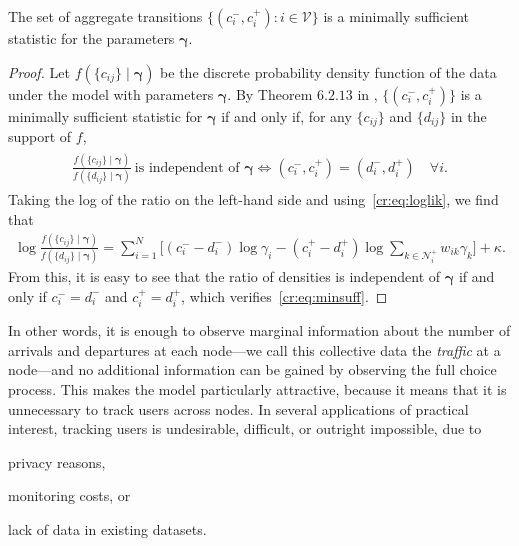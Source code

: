 \begin{theorem}
The set of aggregate transitions  $\{ (c^-_i, c^+_i) : i \in \mathcal{V} \}$ is a minimally sufficient statistic for the parameters $\bm{\gamma}$.
\end{theorem}

\begin{proof}
Let $f(\{ c_{ij} \} \mid \bm{\gamma})$ be the discrete probability density function of the data under the model with parameters $\bm{\gamma}$.
By Theorem $6.2.13$ in \citet{casella2002statistical}, $\{ (c^-_i, c^+_i) \}$ is a minimally sufficient statistic for $\bm{\gamma}$ if and only if, for any $\{ c_{ij} \}$ and $\{ d_{ij} \}$ in the support of $f$,
\begin{align}
\label{cr:eq:minsuff}
\begin{aligned}
\frac{ f(\{ c_{ij} \} \mid \bm{\gamma}) }{ f(\{ d_{ij} \} \mid \bm{\gamma}) }\ \text{is independent of $\bm{\gamma}$}
\iff (c^-_i, c^+_i) = (d^-_i, d^+_i) \quad \forall i.
\end{aligned}
\end{align}
Taking the log of the ratio on the left-hand side and using~\eqref{cr:eq:loglik}, we find that
\begin{align*}
\log \frac{ f(\{ c_{ij} \} \mid \bm{\gamma}) }{ f(\{ d_{ij} \} \mid \bm{\gamma}) } =
  \sum_{i = 1}^N \bigg[ (c^-_i\!-\!d^-_i) \log \gamma_i
                       - (c^+_i\!-\!d^+_i) \log\!\sum_{k \in \mathcal{N}^+_i}\!w_{ik} \gamma_k \bigg] + \kappa.
\end{align*}
From this, it is easy to see that the ratio of densities is independent of $\bm{\gamma}$ if and only if $c^-_i = d^-_i$ and $c^+_i = d^+_i$, which verifies~\eqref{cr:eq:minsuff}.
\end{proof}

In other words, it is enough to observe marginal information about the number of arrivals and departures at each node---we call this collective data the \emph{traffic} at a node---and no additional information can be gained by observing the full choice process.
This makes the model particularly attractive, because it means that it is unnecessary to track users across nodes.
In several applications of practical interest, tracking users is undesirable, difficult, or outright impossible, due to
\begin{enuminline}
\item privacy reasons,
\item monitoring costs, or
\item lack of data in existing datasets.
\end{enuminline}

